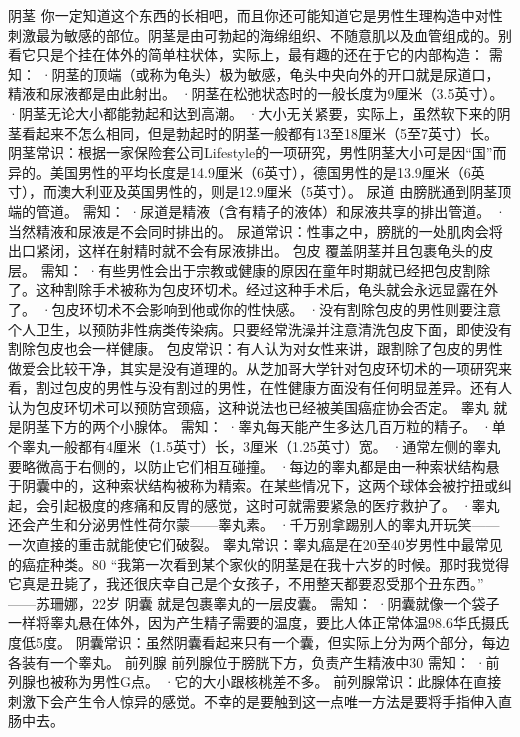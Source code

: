 \documentclass[12pt,UTF8]{ctexbook}
\begin{document}
阴茎
你一定知道这个东西的长相吧，而且你还可能知道它是男性生理构造中对性刺激最为敏感的部位。阴茎是由可勃起的海绵组织、不随意肌以及血管组成的。别看它只是个挂在体外的简单柱状体，实际上，最有趣的还在于它的内部构造：
需知：
·阴茎的顶端（或称为龟头）极为敏感，龟头中央向外的开口就是尿道口，精液和尿液都是由此射出。
·阴茎在松弛状态时的一般长度为9厘米（3.5英寸）。
·阴茎无论大小都能勃起和达到高潮。
·大小无关紧要，实际上，虽然软下来的阴茎看起来不怎么相同，但是勃起时的阴茎一般都有13至18厘米（5至7英寸）长。
阴茎常识：根据一家保险套公司Lifestyle的一项研究，男性阴茎大小可是因“国”而异的。美国男性的平均长度是14.9厘米（6英寸），德国男性的是13.9厘米（6英寸），而澳大利亚及英国男性的，则是12.9厘米（5英寸）。
尿道
由膀胱通到阴茎顶端的管道。
需知：
·尿道是精液（含有精子的液体）和尿液共享的排出管道。
·当然精液和尿液是不会同时排出的。
尿道常识：性事之中，膀胱的一处肌肉会将出口紧闭，这样在射精时就不会有尿液排出。
包皮
覆盖阴茎并且包裹龟头的皮层。
需知：
·有些男性会出于宗教或健康的原因在童年时期就已经把包皮割除了。这种割除手术被称为包皮环切术。经过这种手术后，龟头就会永远显露在外了。
·包皮环切术不会影响到他或你的性快感。
·没有割除包皮的男性则要注意个人卫生，以预防非性病类传染病。只要经常洗澡并注意清洗包皮下面，即使没有割除包皮也会一样健康。
包皮常识：有人认为对女性来讲，跟割除了包皮的男性做爱会比较干净，其实是没有道理的。从芝加哥大学针对包皮环切术的一项研究来看，割过包皮的男性与没有割过的男性，在性健康方面没有任何明显差异。还有人认为包皮环切术可以预防宫颈癌，这种说法也已经被美国癌症协会否定。
睾丸
就是阴茎下方的两个小腺体。
需知：
·睾丸每天能产生多达几百万粒的精子。
·单个睾丸一般都有4厘米（1.5英寸）长，3厘米（1.25英寸）宽。
·通常左侧的睾丸要略微高于右侧的，以防止它们相互碰撞。
·每边的睾丸都是由一种索状结构悬于阴囊中的，这种索状结构被称为精索。在某些情况下，这两个球体会被拧扭或纠起，会引起极度的疼痛和反胃的感觉，这时可就需要紧急的医疗救护了。
·睾丸还会产生和分泌男性性荷尔蒙——睾丸素。
·千万别拿踢别人的睾丸开玩笑——一次直接的重击就能使它们破裂。
睾丸常识：睾丸癌是在20至40岁男性中最常见的癌症种类。80%
“我第一次看到某个家伙的阴茎是在我十六岁的时候。那时我觉得它真是丑毙了，我还很庆幸自己是个女孩子，不用整天都要忍受那个丑东西。”
——苏珊娜，22岁
阴囊
就是包裹睾丸的一层皮囊。
需知：
·阴囊就像一个袋子一样将睾丸悬在体外，因为产生精子需要的温度，要比人体正常体温98.6华氏摄氏度低5度。
阴囊常识：虽然阴囊看起来只有一个囊，但实际上分为两个部分，每边各装有一个睾丸。
前列腺
前列腺位于膀胱下方，负责产生精液中30%
需知：
·前列腺也被称为男性G点。
·它的大小跟核桃差不多。
前列腺常识：此腺体在直接刺激下会产生令人惊异的感觉。不幸的是要触到这一点唯一方法是要将手指伸入直肠中去。
\end{document}
